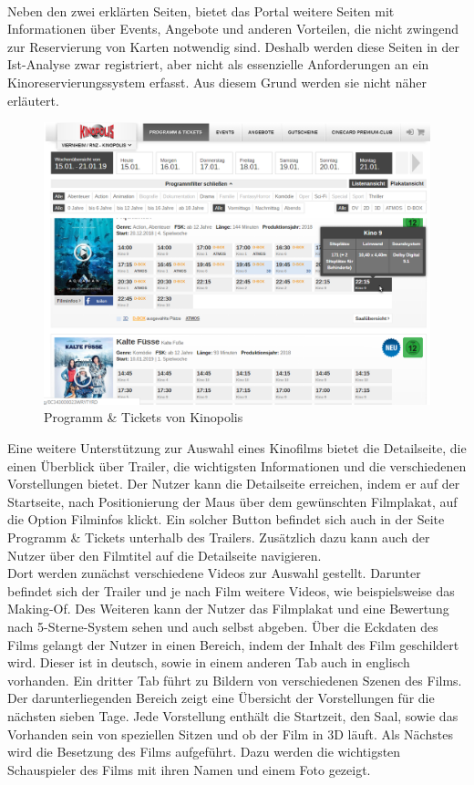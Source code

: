 	\\Neben den zwei erklärten Seiten, bietet das Portal weitere Seiten mit Informationen über Events, Angebote und anderen Vorteilen, die nicht zwingend zur Reservierung von Karten notwendig sind. Deshalb werden diese Seiten in der Ist-Analyse zwar registriert, aber nicht als essenzielle Anforderungen an ein Kinoreservierungssystem erfasst. Aus diesem Grund werden sie nicht näher erläutert.
	\begin{figure}[H]
		\centering 
		\includegraphics[width=14cm]{img/Kinopolis_Programm_Tickets.png}
		\captionsetup{format=hang}
		\centering\caption[Startseite von Kinopolis Viernheim]{\label{fig:Kinop.Progr.}Programm \& Tickets von Kinopolis\footnotemark}
	\end{figure}
	
	Eine weitere Unterstützung zur Auswahl eines Kinofilms bietet die Detailseite, die einen Überblick über Trailer, die wichtigsten Informationen und die verschiedenen Vorstellungen bietet. Der Nutzer kann die  Detailseite erreichen, indem er auf der Startseite, nach Positionierung der Maus über dem gewünschten Filmplakat, auf die Option Filminfos klickt. Ein solcher Button befindet sich auch in der Seite Programm \& Tickets unterhalb des Trailers. Zusätzlich dazu kann auch der Nutzer über den Filmtitel auf die Detailseite navigieren. 
	\\Dort werden zunächst verschiedene Videos zur Auswahl gestellt. Darunter befindet sich der Trailer und je nach Film weitere Videos, wie beispielsweise das Making-Of. Des Weiteren kann der Nutzer das Filmplakat und eine Bewertung nach 5-Sterne-System sehen und auch selbst abgeben. Über die Eckdaten des Films gelangt der Nutzer in einen Bereich, indem der Inhalt des Film geschildert wird. Dieser ist in deutsch, sowie in einem anderen Tab auch in englisch vorhanden. Ein dritter Tab führt zu Bildern von verschiedenen Szenen des Films. Der darunterliegenden Bereich zeigt eine Übersicht der Vorstellungen für die nächsten sieben Tage. Jede Vorstellung enthält die Startzeit, den Saal, sowie das Vorhanden sein von speziellen Sitzen und ob der Film in 3D läuft. Als Nächstes wird die Besetzung des Films aufgeführt. Dazu werden die wichtigsten Schauspieler des Films mit ihren Namen und einem Foto gezeigt.  
	
